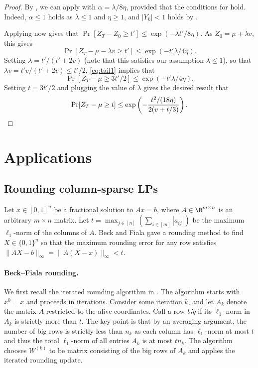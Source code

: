 \documentclass{toc}
\begin{document}
\begin{proof}
By , we can  apply   with $\alpha =  \lambda/8\eta$, provided that the conditions for  hold. 
Indeed, $\alpha \leq 1$ holds as $\lambda \leq 1$ and $\eta \geq 1$, and $|Y_k|< 1$ holds by .

Applying  now gives that $ \Pr[Z_T - Z_0 \geq t'] \leq \exp(-\lambda t'/8\eta)$. As $Z_0=\mu + \lambda v$, this gives
\begin{equation}
    \label{eq:tail1}
    \Pr[ Z_T - \mu - \lambda v \geq  t'] \leq \exp(-t' \lambda/4\eta).
\end{equation}
Setting $\lambda = t'/(t' + 2 v)$ (note that this satisfies our assumption $\lambda \leq 1$), so that $\lambda v  = t'v/(t'+2v) \leq t'/2$, \eqref{eq:tail1} implies that \[
 \Pr[ Z_T - \mu \geq  3t'/2] \leq \exp(- t' \lambda/4\eta). \]
Setting $t=3t'/2$ and plugging the value of $\lambda$ gives the desired result that
 \[ \Pr[Z_T  - \mu \geq t ] \leq \exp\left(-\frac{t^2/(18\eta)}{2(v + t/3)}  \right) .\qedhere \]
\end{proof}

\section{Applications}
\subsection{Rounding column-sparse LPs}
\label{s:bf}
Let $x \in [0,1]^n$ be a fractional solution to $Ax = b$,
where $A \in \R^{m \times n}$ is an arbitrary $m \times n$ matrix. Let $t = \max_{j\in [n]} (\sum_{i\in [m]} |a_{ij}|)$ be the maximum $\ell_1$-norm of the columns
of $A$. Beck and Fiala \cite{BF81} gave a rounding method to find $X \in \{0,1\}^n$ so that the maximum rounding error for any row satisfies $\|AX-b\|_\infty = \|A(X-x)\|_\infty < t$.
\paragraph{Beck--Fiala rounding.} We first recall the iterated rounding algorithm in \cite{BF81}. The algorithm starts with $x^{0}=x$ and proceeds in iterations.
Consider some iteration $k$, and let $A_k$ denote the matrix $A$ restricted to the alive coordinates.
Call a row \emph{big} if its $\ell_1$-norm in $A_k$ is strictly more than $t$. The key point is that by an averaging argument, the number of big rows is strictly less than $n_k$ as each column has $\ell_1$-norm at most $t$ and thus
the total $\ell_1$-norm of all entries $A_k$ is at most $tn_k$.
The algorithm chooses $W^{(k)}$ to be matrix consisting of the big rows of $A_k$ and applies the iterated rounding update.
\end{document}
